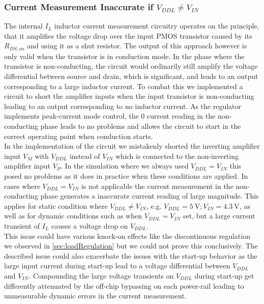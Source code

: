 \subsubsection{Current Measurement Inaccurate if $V_{DDL} \neq V_{IN}$}
\label{subsubsec:cur_mes_inac}
The internal $I_L$ inductor current measurement circuitry operates on the principle, that it amplifies the voltage drop over the input PMOS transistor caused by its $R_{DS,on}$ and using it as a shut resistor. The output of this approach however is only valid when the transistor is in conduction mode. In the phase where the transistor is non-conducting, the circuit would ordinarily still amplify the voltage differential between source and drain, which is significant, and leads to an output corresponding to a large inductor current. To combat this we implemented a circuit to short the amplifier inputs when the input transistor is non-conducting leading to an output corresponding to no inductor current. As the regulator implements peak-current mode control, the 0 current reading in the non-conducting phase leads to no problems and allows the circuit to start in the correct operating point when conduction starts. \\
In the implementation of the circuit we mistakenly shorted the inverting amplifier input $V_M$ with $V_{DDL}$ instead of $V_{IN}$ which is connected to the non-inverting amplifier input $V_P$. In the simulation where we always used $V_{DDL} = V_{IN}$ this posed no problems as it does in practice when these conditions are applied. In cases where $V_{DDL} = V_{IN}$ is not applicable the current measurement in the non-conducting phase generates a inaccurate current reading of large magnitude. This applies for static condition where $V_{DDL} \neq V_{IN}$, e.g. $V_{DDL} = \qty{5}{\volt}; V_{IN}= \qty{4.3}{\volt}$, as well as for dynamic conditions such as when $V_{DDL} = V_{IN}$ set, but a large current transient of $I_L$ causes a voltage drop on $V_{DDL}$.\\
This issue could have various knock-on effects like the discontinuous regulation we observed in \autoref{sec:loadRegulation} but we could not prove this conclusively. The described issue could also exacerbate the issues with the start-up behavior as the large input current during start-up lead to a voltage differential between $V_{DDL}$ and $V_{IN}$. Compounding the large voltage transients on $V_{DDL}$ during start-up get differently attenuated by the off-chip bypassing on each power-rail leading to unmeasurable dynamic errors in the current measurement.

